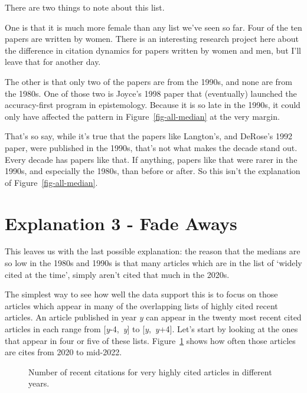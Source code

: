 \documentclass[
  10pt,
  letterpaper,
  DIV=11,
  numbers=noendperiod,
  twoside]{scrartcl}
\begin{document}
There are two things to note about this list.

One is that it is much more female than any list we've seen so far. Four
of the ten papers are written by women. There is an interesting research
project here about the difference in citation dynamics for papers
written by women and men, but I'll leave that for another day.

The other is that only two of the papers are from the 1990s, and none
are from the 1980s. One of those two is Joyce's 1998 paper that
(eventually) launched the accuracy-first program in epistemology.
Because it is so late in the 1990s, it could only have affected the
pattern in Figure~\ref{fig-all-median} at the very margin.

That's so say, while it's true that the papers like Langton's, and
DeRose's 1992 paper, were published in the 1990s, that's not what makes
the decade stand out. Every decade has papers like that. If anything,
papers like that were rarer in the 1990s, and especially the 1980s, than
before or after. So this isn't the explanation of
Figure~\ref{fig-all-median}.

\section{Explanation 3 - Fade Aways}\label{sec-fade-aways}

This leaves us with the last possible explanation: the reason that the
medians are so low in the 1980s and 1990s is that many articles which
are in the list of `widely cited at the time', simply aren't cited that
much in the 2020s.

The simplest way to see how well the data support this is to focus on
those articles which appear in many of the overlapping lists of highly
cited recent articles. An article published in year \emph{y} can appear
in the twenty most recent cited articles in each range from
{[}\emph{y}-4,~\emph{y}{]} to {[}\emph{y},~\emph{y}+4{]}. Let's start by
looking at the ones that appear in four or five of these lists.
Figure~\ref{fig-four-five-recent} shows how often those articles are
cites from 2020 to mid-2022.

\begin{figure}


\caption{\label{fig-four-five-recent}Number of recent citations for very
highly cited articles in different years.}

\end{figure}%
\end{document}
